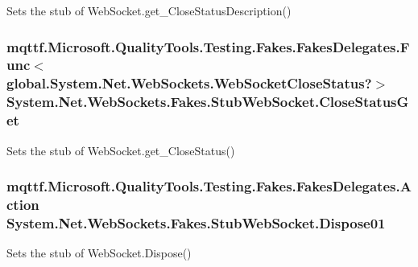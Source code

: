 Sets the stub of Web\-Socket.\-get\-\_\-\-Close\-Status\-Description()

\hypertarget{class_system_1_1_net_1_1_web_sockets_1_1_fakes_1_1_stub_web_socket_a04a60f3ef959b863720ffb5d7ccdb0a6}{
\subsubsection[{Close\-Status\-Get}]{\setlength{\rightskip}{0pt plus 5cm}mqttf.\-Microsoft.\-Quality\-Tools.\-Testing.\-Fakes.\-Fakes\-Delegates.\-Func$<$global.\-System.\-Net.\-Web\-Sockets.\-Web\-Socket\-Close\-Status?$>$ System.\-Net.\-Web\-Sockets.\-Fakes.\-Stub\-Web\-Socket.\-Close\-Status\-Get}}\label{class_system_1_1_net_1_1_web_sockets_1_1_fakes_1_1_stub_web_socket_a04a60f3ef959b863720ffb5d7ccdb0a6}


Sets the stub of Web\-Socket.\-get\-\_\-\-Close\-Status()

\hypertarget{class_system_1_1_net_1_1_web_sockets_1_1_fakes_1_1_stub_web_socket_a172d6ef96a892cb46f53f506d4d89f1c}{
\subsubsection[{Dispose01}]{\setlength{\rightskip}{0pt plus 5cm}mqttf.\-Microsoft.\-Quality\-Tools.\-Testing.\-Fakes.\-Fakes\-Delegates.\-Action System.\-Net.\-Web\-Sockets.\-Fakes.\-Stub\-Web\-Socket.\-Dispose01}}\label{class_system_1_1_net_1_1_web_sockets_1_1_fakes_1_1_stub_web_socket_a172d6ef96a892cb46f53f506d4d89f1c}


Sets the stub of Web\-Socket.\-Dispose()

